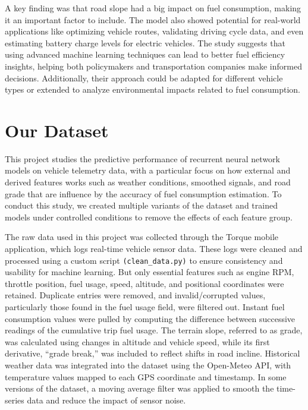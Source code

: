 \documentclass[letterpaper]{article}
\begin{document}
A key finding was that road slope had a big impact on fuel consumption, making it an 
important factor to include. The model also showed potential for real-world applications 
like optimizing vehicle routes, validating driving cycle data, and even estimating battery
charge levels for electric vehicles. The study suggests that using advanced machine learning 
techniques can lead to better fuel efficiency insights, helping both policymakers and 
transportation companies make informed decisions. Additionally, their approach could be 
adapted for different vehicle types or extended to analyze environmental impacts related 
to fuel consumption.


\section*{Our Dataset}
This project studies the predictive performance of recurrent neural network 
models on vehicle telemetry data, with a particular focus on how external 
and derived features works such as weather conditions, smoothed signals, 
and road grade that are influence by the accuracy of fuel consumption 
estimation. To conduct this study, we created multiple variants of the 
dataset and trained models under controlled conditions to remove the 
effects of each feature group.

The raw data used in this project was collected through the Torque mobile 
application, which logs real-time vehicle sensor data. These logs were 
cleaned and processed using a custom script \verb|(clean_data.py)| to ensure 
consistency and usability for machine learning. But only essential 
features such as engine RPM, throttle position, fuel usage, speed, 
altitude, and positional coordinates were retained. Duplicate entries were 
removed, and invalid/corrupted values, particularly those found in the fuel 
usage field, were filtered out. Instant fuel consumption values were pulled 
by computing the difference between successive readings of the cumulative 
trip fuel usage. The terrain slope, referred to as grade, was calculated 
using changes in altitude and vehicle speed, while its first derivative, 
``grade break,'' was included to reflect shifts in road incline. 
Historical weather data was integrated into the dataset using the 
Open-Meteo API, with temperature values mapped to each GPS coordinate 
and timestamp. In some versions of the dataset, a moving average filter 
was applied to smooth the time-series data and reduce the impact of sensor 
noise.
\end{document}
